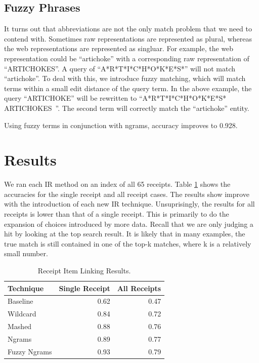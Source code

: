 \documentclass[11pt,a4paper]{article}
\begin{document}
\subsection{Fuzzy Phrases}
It turns out that abbreviations are not the only match problem that we
need to contend with.  Sometimes raw representations are represented
as plural, whereas the web representations are represented as
singluar.  For example, the web representation could be ``artichoke''
with a corresponding raw representation of ``ARTICHOKES''.  A query
of ``A*R*T*I*C*H*O*K*E*S*'' will not match ``artichoke''.  To deal
with this, we introduce fuzzy matching, which will match terms within
a small edit distance of the query term.  In the above example, the
query ``ARTICHOKE'' will be rewritten to ``A*R*T*I*C*H*O*K*E*S*
ARTICHOKES~''.  The second term will correctly match the ``artichoke''
entity.

Using fuzzy terms in conjunction with ngrams, accuracy improves to
0.928. 

\section{Results}

We ran each IR method on an index of all 65 receipts.
Table \ref{table:results} shows the accuracies for the single receipt and
all receipt cases.  The results show improve with the introduction of
each new IR technique.  Unsuprisingly, the results for all receipts is
lower than that of a single receipt.  This is primarily to do the
expansion of choices introduced by more data.  Recall that we are
only judging a hit by looking at the top search result.  It is likely
that in many examples, the true match is still contained in one of the
top-k matches, where k is a relatively small number.

\begin{table}[t!]
\begin{center}
\begin{tabular}{|l|r|r|}
\hline \textbf{Technique} & \textbf{Single Receipt} & \textbf{All Receipts} \\ \hline
Baseline & 0.62 & 0.47 \\
Wildcard & 0.84 & 0.72 \\
Mashed & 0.88 & 0.76 \\
Ngrams & 0.89 & 0.77 \\
Fuzzy Ngrams & 0.93 & 0.79 \\
\hline
\end{tabular}
\end{center}
\caption{\label{table:results} Receipt Item Linking Results. }
\end{table}
\end{document}
